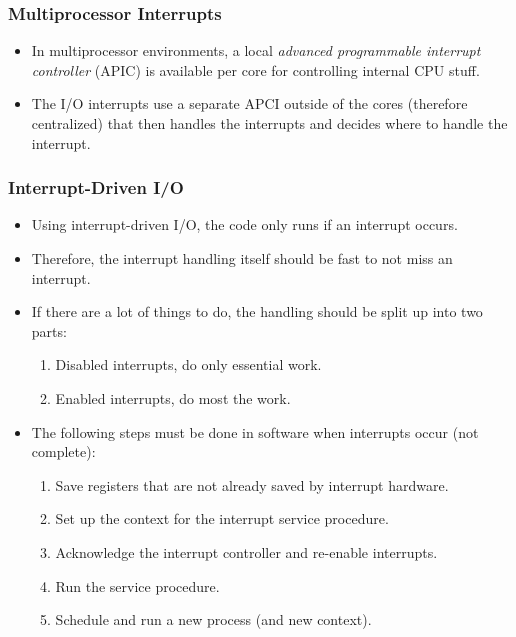 			\subsubsection{Multiprocessor Interrupts}
				\begin{itemize}
					\item In multiprocessor environments, a local \textit{advanced programmable interrupt controller} (APIC) is available per core for controlling internal CPU stuff.
					\item The I/O interrupts use a separate APCI outside of the cores (therefore centralized) that then handles the interrupts and decides where to handle the interrupt.
				\end{itemize}

			\subsubsection{Interrupt-Driven I/O}
				\begin{itemize}
					\item Using interrupt-driven I/O, the code only runs if an interrupt occurs.
					\item Therefore, the interrupt handling itself should be fast to not miss an interrupt.
					\item If there are a lot of things to do, the handling should be split up into two parts:
						\begin{enumerate}
							\item Disabled interrupts, do only essential work.
							\item Enabled interrupts, do most the work.
						\end{enumerate}
					\item The following steps must be done in software when interrupts occur (not complete):
						\begin{enumerate}
							\item Save registers that are not already saved by interrupt hardware.
							\item Set up the context for the interrupt service procedure.
							\item Acknowledge the interrupt controller and re-enable interrupts.
							\item Run the service procedure.
							\item Schedule and run a new process (and new context).
						\end{enumerate}
				\end{itemize}

